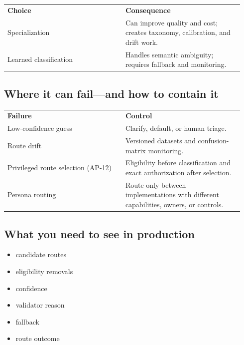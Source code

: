 \BookTableStart
\small
\begin{tabular}{@{}Y{0.4700\linewidth}Y{0.4700\linewidth}@{}}
\color{white}\bfseries \textbf{Choice} & \color{white}\bfseries \textbf{Consequence} \\
Specialization & Can improve quality and cost; creates taxonomy, calibration, and drift work. \\
Learned classification & Handles semantic ambiguity; requires fallback and monitoring. \\
\end{tabular}
\BookTableEnd

\subsection{Where it can fail—and how to contain it}

\BookTableStart
\small
\begin{tabular}{@{}Y{0.4700\linewidth}Y{0.4700\linewidth}@{}}
\color{white}\bfseries \textbf{Failure} & \color{white}\bfseries \textbf{Control} \\
Low-confidence guess & Clarify, default, or human triage. \\
Route drift & Versioned datasets and confusion-matrix monitoring. \\
Privileged route selection (AP-12) & Eligibility before classification and exact authorization after selection. \\
Persona routing & Route only between implementations with different capabilities, owners, or controls. \\
\end{tabular}
\BookTableEnd

\subsection{What you need to see in production}

\begin{itemize}

\item candidate routes

\item eligibility removals

\item confidence

\item validator reason

\item fallback

\item route outcome

\end{itemize}

